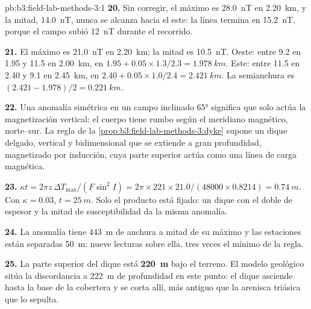 \begin{solution}{pb:b3:field-lab-methods-3:1}
\textbf{20.} Sin corregir, el máximo es \qty{28.0}{nT} en \qty{2.20}{km}, y
la mitad, \qty{14.0}{nT}, nunca se alcanza hacia el este: la línea termina
en \qty{15.2}{nT}, porque el campo subió \qty{12}{nT} durante el
recorrido.

\textbf{21.} El máximo es \qty{21.0}{nT} en \qty{2.20}{km}; la mitad es
\qty{10.5}{nT}. Oeste: entre \num{9.2} en \num{1.95} y \num{11.5} en
\qty{2.00}{km}, en $1.95 + 0.05\times1.3/2.3 = \qty{1.978}{km}$. Este:
entre \num{11.5} en \num{2.40} y \num{9.1} en \qty{2.45}{km}, en
$2.40 + 0.05\times1.0/2.4 = \qty{2.421}{km}$. La semianchura es $(2.421
- 1.978)/2 = \qty{0.221}{km}$.

\textbf{22.} Una anomalía simétrica en un campo inclinado \ang{65} significa que solo
actúa la magnetización vertical: el cuerpo tiene rumbo según el
meridiano magnético, norte--sur. La regla de
la \cref{prop:b3:field-lab-methods-3:dyke} supone un dique delgado, vertical y
bidimensional que se extiende a gran profundidad, magnetizado por inducción, cuya
parte superior actúa como una línea de carga magnética.

\textbf{23.} $\kappa t = 2\pi z\,\Delta T_\mathrm{max}/(F\sin^2 I) = 2\pi\times
221\times21.0/(48000\times0.8214) = \qty{0.74}{m}$. Con $\kappa =
0.03$, $t = \qty{25}{m}$. Solo el producto está fijado: un dique con el doble de
espesor y la mitad de susceptibilidad da la misma anomalía.

\textbf{24.} La anomalía tiene \qty{443}{m} de anchura a mitad de su máximo y las estaciones
están separadas \qty{50}{m}: nueve lecturas sobre ella, tres veces el
mínimo de la regla.

\textbf{25.} La parte superior del dique está
\textbf{\qty[text-series-to-math=true]{220}{m}} bajo el terreno. El
modelo geológico sitúa la discordancia a \qty{222}{m} de profundidad en este punto:
el dique asciende hasta la base de la cobertera y se corta allí, más antiguo
que la arenisca triásica que lo sepulta.
\end{solution}

